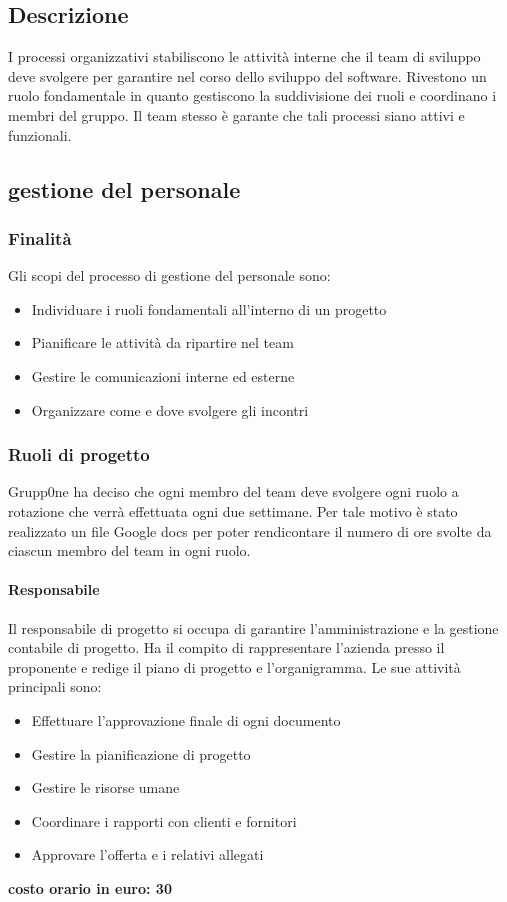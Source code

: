 \documentclass[../norme-di-progetto.tex]{subfiles}
\begin{document}
\subsection{Descrizione}
I processi organizzativi stabiliscono le attività interne che il team di sviluppo deve svolgere per garantire  nel corso dello sviluppo del software. Rivestono un ruolo fondamentale in quanto gestiscono la suddivisione dei ruoli e coordinano i membri del gruppo. Il team stesso è garante che tali processi siano attivi e funzionali.
\subsection{gestione del personale}
\subsubsection{Finalità}
Gli scopi del processo di gestione del personale sono:
\begin{itemize}
	\item Individuare i ruoli fondamentali all'interno di un progetto
	\item Pianificare le attività da ripartire nel team
	\item Gestire le comunicazioni interne ed esterne
	\item Organizzare come e dove svolgere gli incontri
\end{itemize}
\subsubsection{Ruoli di progetto}
Grupp0ne ha deciso che ogni membro del team deve svolgere ogni ruolo a rotazione che verrà effettuata ogni due settimane. Per tale motivo è stato realizzato un file Google docs per poter rendicontare il numero di ore svolte da ciascun membro del team in ogni ruolo.
\paragraph{Responsabile}
Il responsabile di progetto si occupa di garantire l'amministrazione e la gestione contabile di progetto. Ha il compito di rappresentare l'azienda presso il proponente e redige il piano di progetto e l'organigramma. Le sue attività principali sono:
\begin{itemize}
	\item Effettuare l'approvazione finale di ogni documento
	\item Gestire la pianificazione di progetto
	\item Gestire le risorse umane
	\item Coordinare i rapporti con clienti e fornitori 
	\item Approvare l'offerta e i relativi allegati
\end{itemize}
\textbf{costo orario in euro: 30}
\end{document}
